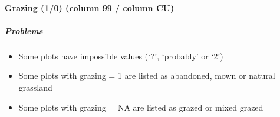 \documentclass[table]{article}
\providecommand{\tightlist}{%
  \setlength{\itemsep}{0pt}\setlength{\parskip}{0pt}}
\let\oldparagraph\paragraph
\renewcommand{\paragraph}[1]{\oldparagraph{#1}\mbox{}}
\let\oldsubparagraph\subparagraph
\renewcommand{\subparagraph}[1]{\oldsubparagraph{#1}\mbox{}}
\begin{document}
\paragraph{Grazing (1/0) (column 99 / column
CU)}\label{grazing-10-column-99-column-cu}

\subparagraph{\texorpdfstring{\emph{Problems}}{Problems}}\label{problems-4}

\begin{itemize}
\tightlist
\item
  Some plots have impossible values (`?', `probably' or `2')
\item
  Some plots with grazing = 1 are listed as abandoned, mown or natural
  grassland
\item
  Some plots with grazing = NA are listed as grazed or mixed grazed
\end{itemize}
\end{document}
